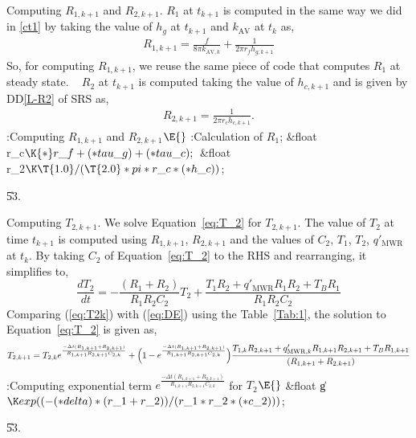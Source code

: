 \documentclass[letterpaper,12pt,baseclass=report]{cweb-hy}
\begin{document}
{Computing ${R_{1,k+1}}$ and ${R_{2,k+1}}$.
$R_1$ at $t_{k+1}$ is computed in the same way we did in
\ref{ct1} by taking the value
of $h_{g}$ at $t_{k+1}$ and $k_{\text{AV}}$ at $t_k$ as,
\begin{align}
R_{1,k+1} = \frac{f}{8\pi k_{\text{AV},k}} + \frac{1}{2\pi r_f h_{g,k+1}}
\end{align}
So, for computing $R_{1,k+1}$, we reuse the same piece of code that computes
$R_1$ at steady state.
~\newline
$R_2$ at $t_{k+1}$ is computed taking the value
of $h_{c,k+1}$ and is given by DD\ref{L-R2} of SRS as,
\begin{align}
R_{2,k+1} = \frac{1}{2\pi r_c h_{c,k+1}}.
\end{align}
\Y\B\4:Computing $R_{1,k+1}$ and $R_{2,k+1}$\X${}\E{}$\6
:Calculation of $R_{1}$\X;\7
\&{float} \\{r\_c}${}\K{*}\\{r\_f}+({*}\\{tau\_g})+({*}\\{tau\_c});{}$\6
\&{float} \\{r\_2}${}\K\T{1.0}/(\T{2.0}*\\{pi}*\\{r\_c}*({*}\\{h\_c})){}$;\par
\U53.\fi

\fi

Computing ${T_{2,k+1}}$.
We solve Equation~\ref{eq:T_2} for ${T_{2,k+1}}$. The value of $T_2$ at time
$t_{k+1}$ is
computed using $R_{1,k+1}$,
$R_{2,k+1}$ and the values of $C_2$, $T_1$, $T_2$, $q'_{\mathrm{MWR}}$ at
$t_{k}$.
By taking $C_2$ of Equation~\ref{eq:T_2} to the RHS and rearranging, it
simplifies to,
\begin{equation}
\frac{dT_{2}}{dt} =-\frac{(R_1+ R_2) }{R_1 R_2 C_2 }T_2+\frac{T_1 R_2+
q'_{\mathrm{MWR}}R_1 R_2+T_B R_1}{R_1 R_2 C_2 } \label{eq:T2k}
\end{equation}
Comparing (\ref{eq:T2k}) with (\ref{eq:DE}) using the Table~\ref{Tab:1}, the
solution to
Equation~\ref{eq:T_2} is given as,
\begin{equation}
T_{2,k+1}=T_{2,k}e^{\frac{-\Delta t (R_{1,k+1} + R_{2,k+1})}{R_{1,k+1}
R_{2,k+1} C_{2,k}}} +
\Bigl(1-e^{\frac{-\Delta t (R_{1,k+1} + R_{2,k+1})}{R_{1,k+1} R_{2,k+1}
C_{2,k}}}\Bigr)
\frac{T_{1,k} R_{2,k+1}+q'_{\mathrm{MWR},k}R_{1,k+1} R_{2,k+1}+T_{B} R_{1,k+1}}
{(R_{1,k+1}+ R_{2,k+1}) }
\end{equation}
\Y\B\4:Computing exponential term $e^{\frac{-\Delta t (R_{1,k+1} +
R_{2,k+1})}{R_{1,k+1} R_{2,k+1} C_{2,k}}}$ for $T_2$\X${}\E{}$\6
\&{float} \|g${}\K\\{exp}(({-}({*}\\{delta})*(\\{r\_1}+\\{r\_2}))/(\\{r\_1}*%
\\{r\_2}*({*}\\{c\_2}))){}$;\par
\U53.\fi

}
\end{document}
